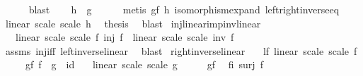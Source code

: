 \begin{isabellebody}
\ \ \ \ \isamarkupfalse%
\ blast\isanewline
\ \ \isamarkupfalse%
\ {\isachardoublequoteopen}h\ {\isacharequal}{\kern0pt}\ g{\isachardoublequoteclose}\isanewline
\ \ \ \ \isamarkupfalse%
\ {\isacharparenleft}{\kern0pt}metis\ gf\ h\ isomorphism{\isacharunderscore}{\kern0pt}expand\ left{\isacharunderscore}{\kern0pt}right{\isacharunderscore}{\kern0pt}inverse{\isacharunderscore}{\kern0pt}eq{\isacharparenright}{\kern0pt}\isanewline
\ \ \isamarkupfalse%
\ {\isacartoucheopen}linear\ scale\ scale\ h{\isacartoucheclose}\ \isamarkupfalse%
\ {\isacharquery}{\kern0pt}thesis\ \isamarkupfalse%
\ blast\isanewline
{}\isamarkupfalse%
%
\endisatagproof
{\isafoldproof}%
%
\isadelimproof
\isanewline
%
\endisadelimproof
\isanewline
{}\isamarkupfalse%
\ inj{\isacharunderscore}{\kern0pt}linear{\isacharunderscore}{\kern0pt}imp{\isacharunderscore}{\kern0pt}inv{\isacharunderscore}{\kern0pt}linear{\isacharcolon}{\kern0pt}\isanewline
\ \ \ {\isachardoublequoteopen}linear\ scale\ scale\ f{\isachardoublequoteclose}\ {\isachardoublequoteopen}inj\ f{\isachardoublequoteclose}\ \ {\isachardoublequoteopen}linear\ scale\ scale\ {\isacharparenleft}{\kern0pt}inv\ f{\isacharparenright}{\kern0pt}{\isachardoublequoteclose}\isanewline
%
\isadelimproof
\ \ %
\endisadelimproof
%
\isatagproof
{}\isamarkupfalse%
\ assms\ inj{\isacharunderscore}{\kern0pt}iff\ left{\isacharunderscore}{\kern0pt}inverse{\isacharunderscore}{\kern0pt}linear\ \isamarkupfalse%
\ blast%
\endisatagproof
{\isafoldproof}%
%
\isadelimproof
\isanewline
%
\endisadelimproof
\isanewline
{}\isamarkupfalse%
\ right{\isacharunderscore}{\kern0pt}inverse{\isacharunderscore}{\kern0pt}linear{\isacharcolon}{\kern0pt}\isanewline
\ \ \ lf{\isacharcolon}{\kern0pt}\ {\isachardoublequoteopen}linear\ scale\ scale\ f{\isachardoublequoteclose}\isanewline
\ \ \ \ \ gf{\isacharcolon}{\kern0pt}\ {\isachardoublequoteopen}f\ {\isasymcirc}\ g\ {\isacharequal}{\kern0pt}\ id{\isachardoublequoteclose}\isanewline
\ \ \ {\isachardoublequoteopen}linear\ scale\ scale\ g{\isachardoublequoteclose}\isanewline
%
\isadelimproof
%
\endisadelimproof
%
\isatagproof
{}\isamarkupfalse%
\ {\isacharminus}{\kern0pt}\isanewline
\ \ \isamarkupfalse%
\ gf\ \isamarkupfalse%
\ fi{\isacharcolon}{\kern0pt}\ {\isachardoublequoteopen}surj\ f{\isachardoublequoteclose}\isanewline

\end{isabellebody}
